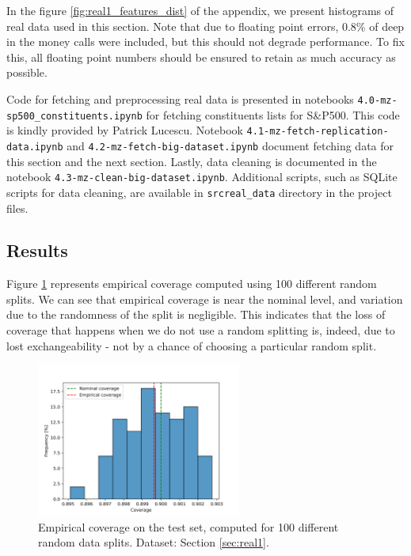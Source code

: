 \documentclass{article}
\theoremstyle{definition}
\begin{document}
In the figure \ref{fig:real1_features_dist} of the appendix, we present histograms of real data used in this section. Note that due to floating point errors, 0.8\% of deep in the money calls were included, but this should not degrade performance. To fix this, all floating point numbers should be ensured to retain as much accuracy as possible.

Code for fetching and preprocessing real data is presented in notebooks \texttt{4.0-mz-sp500\_constituents.ipynb} for fetching constituents lists for S\&P500. This code is kindly provided by Patrick Lucescu. Notebook \texttt{4.1-mz-fetch-replication-data.ipynb} and \texttt{4.2-mz-fetch-big-dataset.ipynb} document fetching data for this section and the next section. Lastly, data cleaning is documented in the notebook \texttt{4.3-mz-clean-big-dataset.ipynb}. Additional scripts, such as SQLite scripts for data cleaning, are available in \texttt{src\/real\_data\/} directory in the project files.

\subsection{Results}

Figure \ref{fig:real1_coverage_hist} represents empirical coverage computed using 100 different random splits. We can see that empirical coverage is near the nominal level, and variation due to the randomness of the split is negligible. This indicates that the loss of coverage that happens when we do not use a random splitting is, indeed, due to lost exchangeability - not by a chance of choosing a particular random split. 

\begin{figure}
\centering
\includegraphics[width=0.6\textwidth]{reports/figures/real_data_replication/real1_coverage_hist.png}
\caption{Empirical coverage on the test set, computed for 100 different random data splits. Dataset: Section \ref{sec:real1}.}
\label{fig:real1_coverage_hist}
\end{figure}
\end{document}
